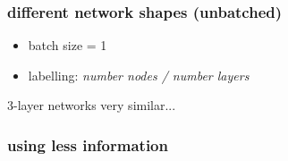 \documentclass{beamer}
\begin{document}
\begin{frame}
  \frametitle{different network shapes (unbatched)}
  \begin{itemize}
  \item batch size = 1
    \item labelling: \textsl{number nodes / number layers}
  \end{itemize}
  
    \begin{figure}[htb]
    \centering
    \end{figure}

    3-layer networks very similar...
\end{frame}

\begin{frame}
  \frametitle{using less information}
    \begin{figure}[htb]
    \centering
  \end{figure}

\end{frame}
\end{document}
